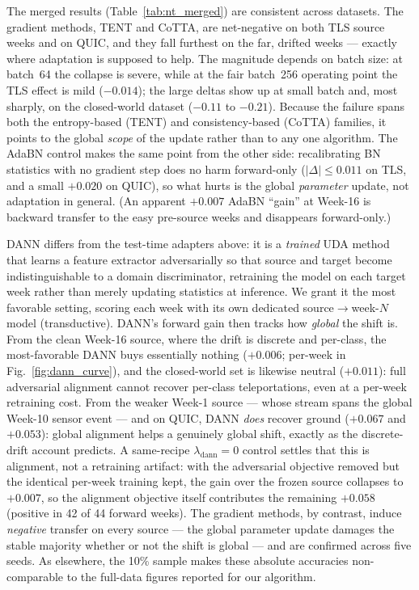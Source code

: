 The merged results (Table~\ref{tab:nt_merged}) are consistent across datasets. The
gradient methods, TENT and CoTTA, are net-negative on both TLS source weeks and
on QUIC, and they fall furthest on the far, drifted weeks --- exactly where
adaptation is supposed to help. The magnitude depends on batch size: at batch~64
the collapse is severe, while at the fair batch~256 operating point the TLS effect
is mild ($-0.014$); the large deltas show up at small batch and, most sharply, on
the closed-world dataset ($-0.11$ to $-0.21$). Because the failure spans both the
entropy-based (TENT) and consistency-based (CoTTA) families, it points to the
global \emph{scope} of the update rather than to any one algorithm. The AdaBN
control makes the same point from the other side: recalibrating BN statistics with
no gradient step does no harm forward-only ($|\Delta|\le0.011$ on TLS, and a small
$+0.020$ on QUIC), so what hurts is the global \emph{parameter} update, not
adaptation in general. (An apparent $+0.007$ AdaBN ``gain'' at Week-16 is backward
transfer to the easy pre-source weeks and disappears forward-only.)

DANN \cite{ganin2016dann} differs from the test-time adapters above: it is a
\emph{trained} UDA method that learns a feature extractor adversarially so that
source and target become indistinguishable to a domain discriminator, retraining
the model on each target week rather than merely updating statistics at inference.
We grant it the most favorable setting, scoring each week with its own dedicated
source$\to$week-$N$ model (transductive). DANN's forward gain then tracks how
\emph{global} the shift is. From the clean Week-16 source, where the drift is
discrete and per-class, the most-favorable DANN buys essentially nothing ($+0.006$;
per-week in Fig.~\ref{fig:dann_curve}), and the closed-world set is likewise neutral
($+0.011$): full adversarial alignment cannot recover per-class teleportations, even
at a per-week retraining cost. From the weaker Week-1 source --- whose stream spans
the global Week-10 sensor event --- and on QUIC, DANN \emph{does} recover ground
($+0.067$ and $+0.053$): global alignment helps a genuinely global shift, exactly as
the discrete-drift account predicts. A same-recipe $\lambda_{\mathrm{dann}}{=}0$
control settles that this is alignment, not a retraining artifact: with the
adversarial objective removed but the identical per-week training kept, the gain
over the frozen source collapses to $+0.007$, so the alignment objective itself
contributes the remaining $+0.058$ (positive in 42 of 44 forward weeks). The
gradient methods, by contrast, induce \emph{negative} transfer on every source ---
the global parameter update damages the stable majority whether or not the shift is
global --- and are confirmed across five seeds. As elsewhere, the 10\% sample makes
these absolute accuracies non-comparable to the full-data figures reported for our algorithm.

